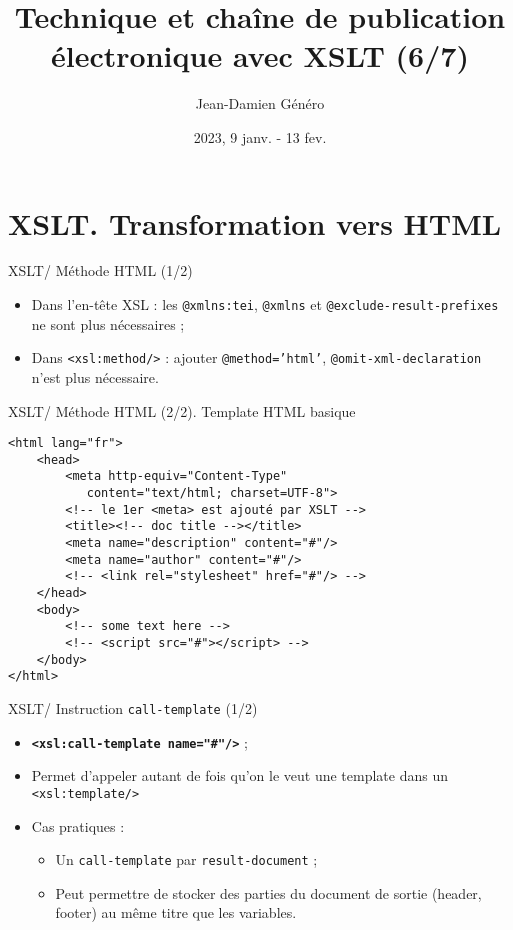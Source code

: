 \documentclass{beamer}
\title{Technique et chaîne de publication électronique avec XSLT (6/7)}
\date{2023, 9 janv. - 13 fev.}
\author{Jean-Damien Généro}
\institute{École nationale des chartes -- M2 TNAH}
\begin{document}
    \maketitle

    \section{XSLT. Transformation vers HTML}

    \begin{frame}{XSLT/ Méthode HTML (1/2)}
        \Large
        \begin{itemize}
            \item Dans l'en-tête XSL : les \texttt{@xmlns:tei}, \texttt{@xmlns} et \texttt{@exclude-result-prefixes} ne sont plus nécessaires ;
            \bigskip
            \item Dans \texttt{<xsl:method/>} : ajouter \texttt{@method='html'}, \texttt{@omit-xml-declaration} n'est plus nécessaire.
        \end{itemize}
    \end{frame}

    \begin{frame}[fragile]{XSLT/ Méthode HTML (2/2). Template HTML basique}
        \begin{verbatim}
<html lang="fr">
    <head>
        <meta http-equiv="Content-Type" 
           content="text/html; charset=UTF-8">
        <!-- le 1er <meta> est ajouté par XSLT -->
        <title><!-- doc title --></title>
        <meta name="description" content="#"/>
        <meta name="author" content="#"/>
        <!-- <link rel="stylesheet" href="#"/> -->
    </head>
    <body>
        <!-- some text here -->
        <!-- <script src="#"></script> -->
    </body>
</html>
        \end{verbatim}
    \end{frame}
    
    \begin{frame}{XSLT/ Instruction \texttt{call-template} (1/2)}
        \Large
        \begin{itemize}
            \item \textbf{\texttt{<xsl:call-template name="\#"/>}} ;
            \item Permet d'appeler autant de fois qu'on le veut une template dans un \texttt{<xsl:template/>}
            \item Cas pratiques :
            \begin{itemize}
            \Large
                \item Un \texttt{call-template} par \texttt{result-document} ;
                \item Peut permettre de stocker des parties du document de sortie (header, footer) au même titre que les variables.
            \end{itemize}
        \end{itemize}
    \end{frame}
\end{document}
